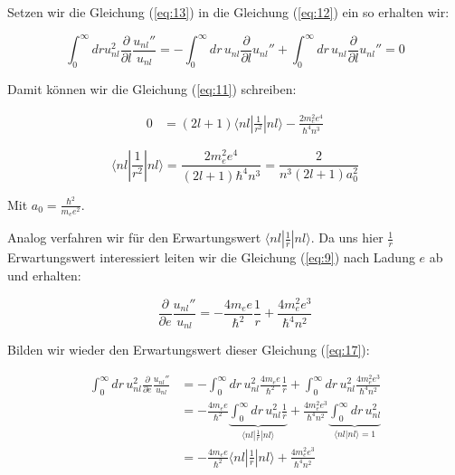 Setzen wir die Gleichung (\ref{eq:13}) in die Gleichung (\ref{eq:12}) ein so erhalten wir:

\begin{equation}
  \label{eq:14}
   \int_0^{\infty}dr u_{nl}^2 \frac{\partial}{\partial l}\frac{u_{nl}''}{u_{nl}}=  - \int_0^{\infty}dr\, u_{nl} \frac{\partial}{\partial l} u_{nl}''  +\int_0^{\infty}dr\,  u_{nl} \frac{\partial}{\partial l}u_{nl}'' = 0
\end{equation}



Damit können wir die Gleichung (\ref{eq:11}) schreiben:

\begin{align}
  \label{eq:15}
  0 &=(2l+1)\langle nl|\frac{1}{r^2}|nl\rangle   -\frac{2 m_e^2e^4}{\hbar^4 n^3}
\end{align}

\begin{equation}
  \label{eq:16}
  \boxed{\langle nl|\frac{1}{r^2}|nl\rangle = \frac{2 m_e^2e^4}{(2l+1)\hbar^4 n^3}=\frac{2}{n^3(2l+1)a_0^2} }
\end{equation}

Mit \(a_0=\frac{\hbar^2}{m_e e^2}\).

Analog verfahren wir für den Erwartungswert \(\langle nl| \frac{1}{r}|nl \rangle \). Da uns hier \(\frac{1}{r}\) Erwartungswert interessiert leiten wir die Gleichung (\ref{eq:9}) nach Ladung \(e\) ab und erhalten:

\begin{equation}
  \label{eq:17}
   \frac{\partial}{\partial e}\frac{u_{nl}''}{u_{nl}} = - \frac{4m_e e}{\hbar^2}\frac{1}{r}+\frac{4m_e^2e^3}{\hbar^4 n^2}
\end{equation}

Bilden wir wieder den Erwartungswert dieser Gleichung (\ref{eq:17}):

\begin{align}
  \label{eq:18}
\int_0^\infty dr\, u_{nl}^2\frac{\partial}{\partial e}\frac{u_{nl}''}{u_{nl}} &= -\int_0^\infty dr\, u_{nl}^2 \frac{4m_e e}{\hbar^2}\frac{1}{r}+ \int_0^\infty dr\, u_{nl}^2\frac{4m_e^2e^3}{\hbar^4 n^2} \\
 &= -\frac{4m_e e}{\hbar^2} \underbrace{\int_0^\infty dr\, u_{nl}^2 \frac{1}{r}}_{\langle nl|\frac{1}{r}|nl\rangle } + \frac{4m_e^2e^3}{\hbar^4 n^2}\underbrace{ \int_0^\infty dr\, u_{nl}^2}_{\langle nl|nl\rangle =1} \\
 &= -\frac{4m_e e}{\hbar^2} \langle nl|\frac{1}{r}|nl\rangle  + \frac{4m_e^2e^3}{\hbar^4 n^2}
\end{align}



